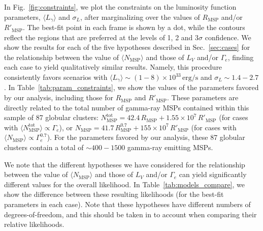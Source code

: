 In Fig.~\ref{fig:constraints}, we plot the constraints on the luminosity function parameters, $\langle L_{\gamma} \rangle$ and $\sigma_L$, after marginalizing over the values of $R_\textrm{MSP}$ and/or $R'_\textrm{MSP}$. The best-fit point in each frame is shown by a dot, while the contours reflect the regions that are preferred at the levels of 1, 2 and 3$\sigma$ confidence. We show the results for each of the five hypotheses described in Sec.~\ref{sec:cases} for the relationship between the value of $\langle N_\textrm{MSP}\rangle$ and those of $L_V$ and/or $\Gamma_e$, finding each case to yield qualitatively similar results. Namely, this procedure consistently favors scenarios with $\langle L_{\gamma}\rangle \sim (1-8)\times 10^{33}\, \textrm{erg/s}$ and $\sigma_L \sim 1.4-2.7$. In Table~\ref{tab:param_constraints}, we show the values of the parameters favored by our analysis, including those for $R_\textrm{MSP}$ and $R'_\textrm{MSP}$. These parameters are directly related to the total number of gamma-ray MSPs contained within this sample of 87 globular clusters:  $N^\textrm{tot}_\textrm{MSP}=42.4 \, R_\textrm{MSP} + 1.55 \times 10^7 \, R'_\textrm{MSP}$ (for cases with $\langle N^\textrm{tot}_\textrm{MSP} \rangle \propto \Gamma_e$), or $N_\textrm{MSP}=41.7 \, R_\textrm{MSP}^{0.7} + 155 \times 10^7 \, R'_\textrm{MSP}$ (for cases with $\langle N_\textrm{MSP} \rangle \propto \Gamma_e^{0.7}$). For the parameters favored by our analysis, these 87 globular clusters contain a total of $\sim 400-1500$ gamma-ray emitting MSPs.

We note that the different hypotheses we have considered for the relationship between the value of $\langle N_\textrm{MSP}\rangle$ and those of $L_V$ and/or $\Gamma_e$ can yield significantly different values for the overall likelihood. In Table~\ref{tab:models_compare}, we show the difference between these resulting likelihoods (for the best-fit parameters in each case). Note that these hypotheses have different numbers of degrees-of-freedom, and this should be taken in to account when comparing their relative likelihoods.



